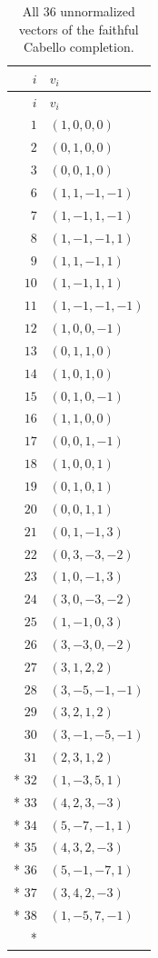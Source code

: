 \documentclass[aps,pra,reprint,superscriptaddress,longbibliography,nofootinbib,floatfix,10pt]{revtex4-2}
\theoremstyle{definition}
\begin{document}
\begin{longtable}{rl}
\caption{All 36 unnormalized vectors of the faithful Cabello completion.}\label{tab:cabello36-vectors}\\
\toprule
$i$ & $v_i$\\\midrule
\endfirsthead
\toprule
$i$ & $v_i$\\\midrule
\endhead
\bottomrule\endfoot
$1$ & $(1,0,0,0)$\\
$2$ & $(0,1,0,0)$\\
$3$ & $(0,0,1,0)$\\
$6$ & $(1,1,-1,-1)$\\
$7$ & $(1,-1,1,-1)$\\
$8$ & $(1,-1,-1,1)$\\
$9$ & $(1,1,-1,1)$\\
$10$ & $(1,-1,1,1)$\\
$11$ & $(1,-1,-1,-1)$\\
$12$ & $(1,0,0,-1)$\\
$13$ & $(0,1,1,0)$\\
$14$ & $(1,0,1,0)$\\
$15$ & $(0,1,0,-1)$\\
$16$ & $(1,1,0,0)$\\
$17$ & $(0,0,1,-1)$\\
$18$ & $(1,0,0,1)$\\
$19$ & $(0,1,0,1)$\\
$20$ & $(0,0,1,1)$\\
$21$ & $(0,1,-1,3)$\\
$22$ & $(0,3,-3,-2)$\\
$23$ & $(1,0,-1,3)$\\
$24$ & $(3,0,-3,-2)$\\
$25$ & $(1,-1,0,3)$\\
$26$ & $(3,-3,0,-2)$\\
$27$ & $(3,1,2,2)$\\
$28$ & $(3,-5,-1,-1)$\\
$29$ & $(3,2,1,2)$\\
$30$ & $(3,-1,-5,-1)$\\
$31$ & $(2,3,1,2)$\\*
$32$ & $(1,-3,5,1)$\\*
$33$ & $(4,2,3,-3)$\\*
$34$ & $(5,-7,-1,1)$\\*
$35$ & $(4,3,2,-3)$\\*
$36$ & $(5,-1,-7,1)$\\*
$37$ & $(3,4,2,-3)$\\*
$38$ & $(1,-5,7,-1)$\\*
\end{longtable}
\end{document}
